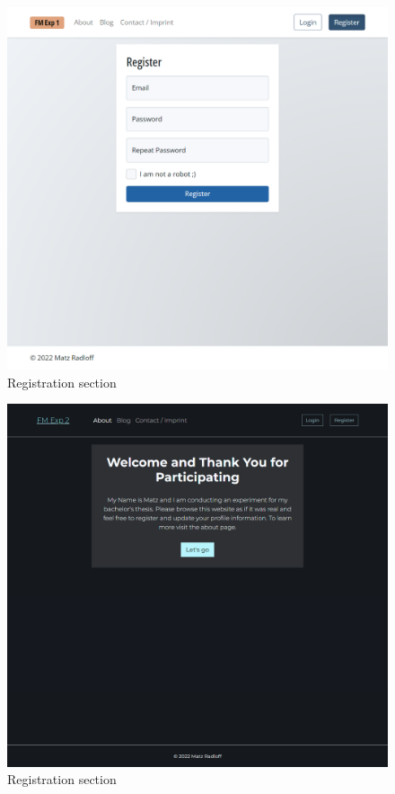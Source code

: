 \documentclass[
    fontsize=12pt,
    headings=small,
    parskip=half,           %
    bibliography=totoc,
    numbers=noenddot,       %
    open=any,               %
    final,                   %
    table
]{scrreprt}
\begin{document}
\begin{figure}[H]
    \includegraphics[width=\textwidth]{screenshots/fmexp1_register.png}
    \caption{Registration section}
    \label{screenshot:fmexp1_register}
\end{figure}

\begin{figure}[H]
    \includegraphics[width=\textwidth]{screenshots/fmexp2_consent.png}
    \caption{Registration section}
    \label{screenshot:fmexp2_consent}
\end{figure}
\end{document}
